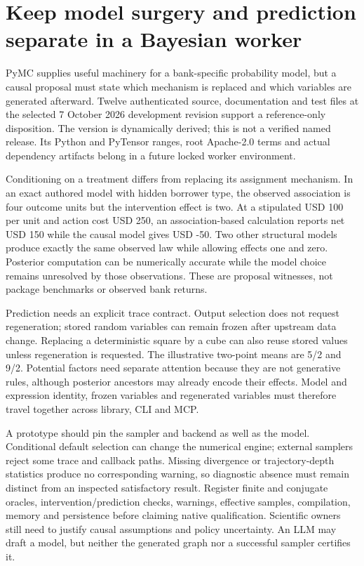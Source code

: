 \hypertarget{keep-model-surgery-and-prediction-separate-in-a-bayesian-worker}{%
\section{Keep model surgery and prediction separate in a Bayesian
worker}\label{keep-model-surgery-and-prediction-separate-in-a-bayesian-worker}}

PyMC supplies useful machinery for a bank-specific probability model,
but a causal proposal must state which mechanism is replaced and which
variables are generated afterward. Twelve authenticated source,
documentation and test files at the selected 7 October 2026 development
revision support a reference-only disposition. The version is
dynamically derived; this is not a verified named release. Its Python
and PyTensor ranges, root Apache-2.0 terms and actual dependency
artifacts belong in a future locked worker environment.
\citep{exec23_pymc_sources}

Conditioning on a treatment differs from replacing its assignment
mechanism. In an exact authored model with hidden borrower type, the
observed association is four outcome units but the intervention effect
is two. At a stipulated USD 100 per unit and action cost USD 250, an
association-based calculation reports net USD 150 while the causal model
gives USD -50. Two other structural models produce exactly the same
observed law while allowing effects one and zero. Posterior computation
can be numerically accurate while the model choice remains unresolved by
those observations. These are proposal witnesses, not package benchmarks
or observed bank returns. \citep{exec23_pymc_reference}

Prediction needs an explicit trace contract. Output selection does not
request regeneration; stored random variables can remain frozen after
upstream data change. Replacing a deterministic square by a cube can
also reuse stored values unless regeneration is requested. The
illustrative two-point means are 5/2 and 9/2. Potential factors need
separate attention because they are not generative rules, although
posterior ancestors may already encode their effects. Model and
expression identity, frozen variables and regenerated variables must
therefore travel together across library, CLI and MCP.
\citep{exec23_pymc_sources,exec23_pymc_reference}

A prototype should pin the sampler and backend as well as the model.
Conditional default selection can change the numerical engine; external
samplers reject some trace and callback paths. Missing divergence or
trajectory-depth statistics produce no corresponding warning, so
diagnostic absence must remain distinct from an inspected satisfactory
result. Register finite and conjugate oracles, intervention/prediction
checks, warnings, effective samples, compilation, memory and persistence
before claiming native qualification. Scientific owners still need to
justify causal assumptions and policy uncertainty. An LLM may draft a
model, but neither the generated graph nor a successful sampler
certifies it. \citep{exec23_pymc_sources}

